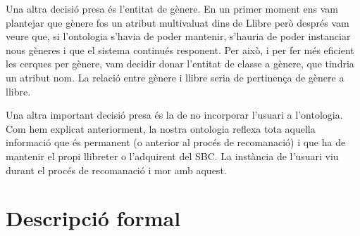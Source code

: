 Una altra decisió presa és l'entitat de gènere. En un primer moment ens vam plantejar que gènere fos un atribut multivaluat dins de Llibre però després vam veure que, si l'ontologia s'havia de poder mantenir, s'hauria de poder instanciar nous gèneres i que el sistema continués responent. Per això, i per fer més eficient les cerques per gènere, vam decidir donar l'entitat de classe a gènere, que tindria un atribut nom. La relació entre gènere i llibre seria de pertinença de gènere a llibre.

Una altra important decisió presa és la de no incorporar l'usuari a l'ontologia. Com hem explicat anteriorment, la nostra ontologia reflexa tota aquella informació que és permanent (o anterior al procés de recomanació) i que ha de mantenir el propi llibreter o l'adquirent del SBC. La instància de l'usuari viu durant el procés de recomanació i mor amb aquest.



\section{Descripció formal}

